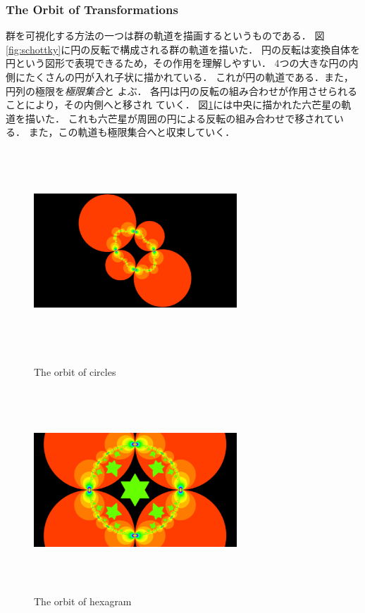 \subsubsection{The Orbit of Transformations}

群を可視化する方法の一つは群の軌道を描画するというものである．
図\ref{fig:schottky}に円の反転で構成される群の軌道を描いた．
円の反転は変換自体を円という図形で表現できるため，その作用を理解しやすい．
4つの大きな円の内側にたくさんの円が入れ子状に描かれている．
これが円の軌道である．また，円列の極限を\emph{極限集合}と
よぶ．
各円は円の反転の組み合わせが作用させられることにより，その内側へと移され
ていく．
図\ref{fig:orbit}には中央に描かれた六芒星の軌道を描いた．
これも六芒星が周囲の円による反転の組み合わせで移されている．
また，この軌道も極限集合へと収束していく．
\begin{figure}[htbp]
 \begin{minipage}{0.49\hsize}
  \center
  \includegraphics[width=3in, height=3in, keepaspectratio]{../img/klein/schottkyCircles.pdf}
  \caption{The orbit of circles}
  \label{fig:schottky}
 \end{minipage}
 \begin{minipage}{0.49\hsize}
  \center
  \includegraphics[width=3in, height=3in, keepaspectratio]{../img/klein/starOrbit.pdf}
  \caption{The orbit of hexagram}
  \label{fig:orbit}
 \end{minipage}
\end{figure}

